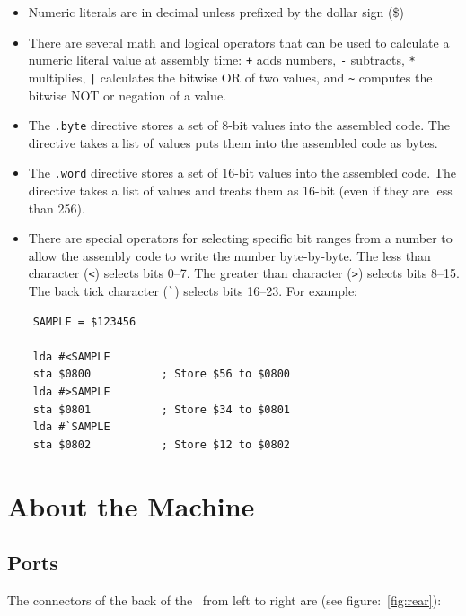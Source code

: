 \begin{itemize}
\item Numeric literals are in decimal unless prefixed by the dollar sign (\$)
\item There are several math and logical operators that can be used to calculate a numeric literal value at assembly time: \verb|+| adds numbers, \verb+-+ subtracts, \verb+*+ multiplies, \verb+|+ calculates the bitwise OR of two values, and \verb+~+ computes the bitwise NOT or negation of a value.
\item The \verb+.byte+ directive stores a set of 8-bit values into the assembled code. The directive takes a list of values puts them into the assembled code as bytes.
\item The \verb+.word+ directive stores a set of 16-bit values into the assembled code. The directive takes a list of values and treats them as 16-bit (even if they are less than 256).
\item There are special operators for selecting specific bit ranges from a number to allow the assembly code to write the number byte-by-byte. The less than character (\verb+<+) selects bits 0--7. The greater than character (\verb+>+) selects bits 8--15. The back tick character (\verb+`+) selects bits 16--23. For example:
\end{itemize}

\begin{verbatim}
    SAMPLE = $123456

    lda #<SAMPLE
    sta $0800           ; Store $56 to $0800
    lda #>SAMPLE
    sta $0801           ; Store $34 to $0801
    lda #`SAMPLE
    sta $0802           ; Store $12 to $0802
\end{verbatim}

\section*{About the Machine}

\subsection*{Ports}

The connectors of the back of the \jr\ from left to right are (see figure:~\ref{fig:rear}):

